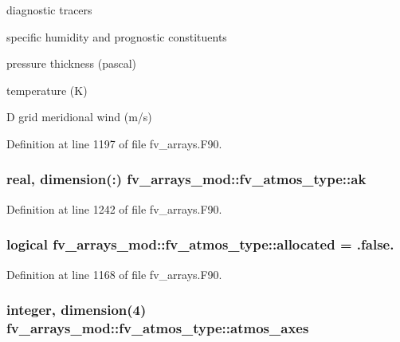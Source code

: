 diagnostic tracers

specific humidity and prognostic constituents

pressure thickness (pascal)

temperature (K)

D grid meridional wind (m/s) 

Definition at line 1197 of file fv\-\_\-arrays.\-F90.

\subsubsection[{ak}]{\setlength{\rightskip}{0pt plus 5cm}real, dimension(\-:) fv\-\_\-arrays\-\_\-mod\-::fv\-\_\-atmos\-\_\-type\-::ak}\label{structfv__arrays__mod_1_1fv__atmos__type_aef6fdeb7a3c7c74773f35929a200f4e5}


Definition at line 1242 of file fv\-\_\-arrays.\-F90.

\subsubsection[{allocated}]{\setlength{\rightskip}{0pt plus 5cm}logical fv\-\_\-arrays\-\_\-mod\-::fv\-\_\-atmos\-\_\-type\-::allocated = .false.}\label{structfv__arrays__mod_1_1fv__atmos__type_aad4bddd3e4ffbb1cf0b37c3057709fdc}


Definition at line 1168 of file fv\-\_\-arrays.\-F90.

\subsubsection[{atmos\-\_\-axes}]{\setlength{\rightskip}{0pt plus 5cm}integer, dimension(4) fv\-\_\-arrays\-\_\-mod\-::fv\-\_\-atmos\-\_\-type\-::atmos\-\_\-axes}\label{structfv__arrays__mod_1_1fv__atmos__type_a32f9a169b6f3e0c138d9e069d6916083}


